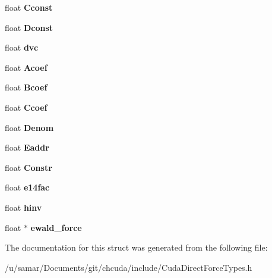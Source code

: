 \begin{DoxyCompactItemize}
float {\bfseries Cconst}
\item 
\hypertarget{structDirectSettings__t_a8df6cc6bfd088de06996dc5b6dad8dcd}{}\label{structDirectSettings__t_a8df6cc6bfd088de06996dc5b6dad8dcd} 
float {\bfseries Dconst}
\item 
\hypertarget{structDirectSettings__t_a12d192af6a3e1ec848762e5fa10be627}{}\label{structDirectSettings__t_a12d192af6a3e1ec848762e5fa10be627} 
float {\bfseries dvc}
\item 
\hypertarget{structDirectSettings__t_af7b01c3fa3db48008a3f990236f618d3}{}\label{structDirectSettings__t_af7b01c3fa3db48008a3f990236f618d3} 
float {\bfseries Acoef}
\item 
\hypertarget{structDirectSettings__t_a484aa6c211322d439d1f48411b6338b4}{}\label{structDirectSettings__t_a484aa6c211322d439d1f48411b6338b4} 
float {\bfseries Bcoef}
\item 
\hypertarget{structDirectSettings__t_ab11224012322d916579223ccde6dc4cf}{}\label{structDirectSettings__t_ab11224012322d916579223ccde6dc4cf} 
float {\bfseries Ccoef}
\item 
\hypertarget{structDirectSettings__t_ac7a18a12bca050572a20b5f6423360f4}{}\label{structDirectSettings__t_ac7a18a12bca050572a20b5f6423360f4} 
float {\bfseries Denom}
\item 
\hypertarget{structDirectSettings__t_a5e58f8f291da9dbfa565d12b49d247f5}{}\label{structDirectSettings__t_a5e58f8f291da9dbfa565d12b49d247f5} 
float {\bfseries Eaddr}
\item 
\hypertarget{structDirectSettings__t_a2bcb109b23a7346c941a7ce857442568}{}\label{structDirectSettings__t_a2bcb109b23a7346c941a7ce857442568} 
float {\bfseries Constr}
\item 
\hypertarget{structDirectSettings__t_a67250c768a1cec1a05d759e395293046}{}\label{structDirectSettings__t_a67250c768a1cec1a05d759e395293046} 
float {\bfseries e14fac}
\item 
\hypertarget{structDirectSettings__t_ac4c7569da2b9b9964e75992b5251d70a}{}\label{structDirectSettings__t_ac4c7569da2b9b9964e75992b5251d70a} 
float {\bfseries hinv}
\item 
\hypertarget{structDirectSettings__t_ae3710b1e4dc693eda79f62280406a6c3}{}\label{structDirectSettings__t_ae3710b1e4dc693eda79f62280406a6c3} 
float $\ast$ {\bfseries ewald\+\_\+force}
\end{DoxyCompactItemize}


The documentation for this struct was generated from the following file\+:\begin{DoxyCompactItemize}
\item 
/u/samar/\+Documents/git/chcuda/include/Cuda\+Direct\+Force\+Types.\+h\end{DoxyCompactItemize}
